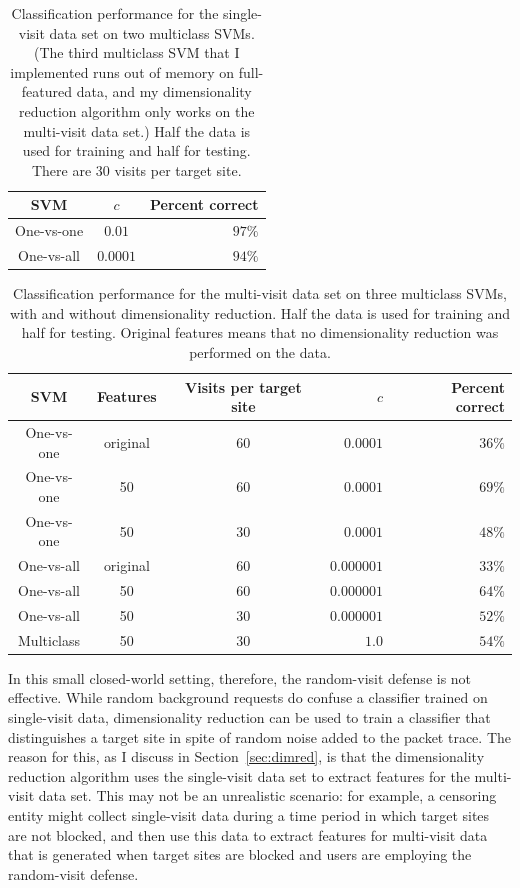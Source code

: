 \documentclass[10pt, twocolumn]{article}
\begin{document}
\begin{table}
\caption{Classification performance for the single-visit data set on two multiclass SVMs. (The third multiclass SVM that 
I implemented runs out of memory on full-featured data, and my dimensionality reduction algorithm only works on 
the multi-visit data set.) Half the data 
is used for training and half for testing. There are $30$ visits per target site.}
\begin{center}
\begin{tabular}{|c|c|r|}
\hline
SVM & $c$ & Percent correct \\ \hline
One-vs-one &$0.01$ & $97\%$ \\ \hline
One-vs-all &  $0.0001$ & $94\%$ \\ \hline
\end{tabular}
\end{center}
\label{tab:singleperf}
\end{table}%

\begin{table}
\caption{Classification performance for the multi-visit data set on three multiclass SVMs, with and without 
dimensionality reduction. Half the data 
is used for training and half for testing. Original features means that no dimensionality reduction was 
performed on the data.}
\begin{center}
\begin{tabular}{|c|c|c|r|r|}
\hline
SVM & Features & Visits per target site & $c$ & Percent correct \\ \hline
One-vs-one & original & 60 & $0.0001$ & $36\%$ \\ \hline
One-vs-one & 50 & 60 & $0.0001$ & $69\%$ \\ \hline
One-vs-one & 50 & 30 & $0.0001$ & $48\%$ \\ \hline
One-vs-all & original & 60 & $0.000001$ & $33\%$ \\ \hline
One-vs-all & 50 & 60 & $0.000001$ & $64\%$ \\ \hline
One-vs-all & 50 & 30 & $0.000001$ & $52\%$ \\ \hline
Multiclass & 50 & 30 & $1.0$ & $54\%$ \\ \hline
\end{tabular}
\end{center}
\label{tab:multiperf}
\end{table}%


In this small closed-world setting, therefore, the random-visit defense is not effective. While random background 
requests do confuse a classifier trained on single-visit data, dimensionality reduction can be used to train a classifier that 
distinguishes a target site in spite of random noise added to the packet trace. The reason for this, as I discuss in Section~\ref{sec:dimred}, is that the dimensionality reduction algorithm uses the single-visit data set to extract features for the multi-visit 
data set. This may not be an unrealistic scenario: for example, a censoring entity might collect single-visit data during a time 
period in which target sites are not blocked, and then use this data to extract features for multi-visit data that is generated 
when target sites are blocked and users are employing the random-visit defense.
\end{document}
